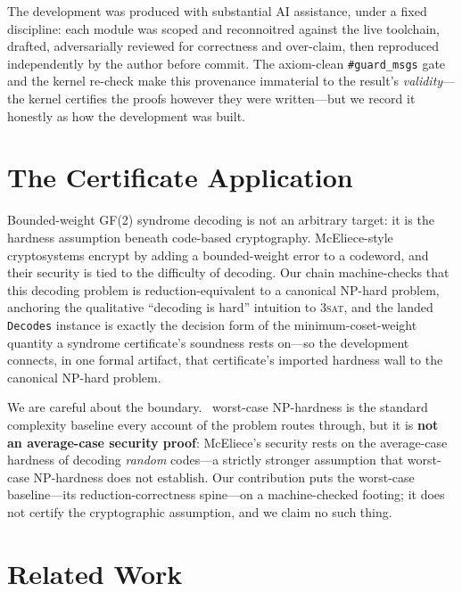 \documentclass[a4paper,UKenglish,cleveref,autoref]{lipics-v2021}
\begin{document}
The development was produced with substantial AI assistance, under a fixed discipline: each module was scoped
and reconnoitred against the live toolchain, drafted, adversarially reviewed for correctness and over-claim,
then reproduced independently by the author before commit. The axiom-clean \lstinline{#guard_msgs} gate and the
kernel re-check make this provenance immaterial to the result's \emph{validity}---the kernel certifies the
proofs however they were written---but we record it honestly as how the development was built.

\section{The Certificate Application}\label{sec:app}

Bounded-weight GF(2) syndrome decoding is not an arbitrary target: it is the hardness assumption beneath
code-based cryptography. McEliece-style cryptosystems encrypt by adding a bounded-weight error to a codeword,
and their security is tied to the difficulty of decoding. Our chain machine-checks that this decoding problem is
reduction-equivalent to a canonical NP-hard problem, anchoring the qualitative ``decoding is hard'' intuition to
\textsc{3sat}, and the landed \lstinline{Decodes} instance is exactly the decision form of the
minimum-coset-weight quantity a syndrome certificate's soundness rests on---so the development connects, in one
formal artifact, that certificate's imported hardness wall to the canonical NP-hard problem.

We are careful about the boundary.~\cite{BMvT78} worst-case NP-hardness is the standard complexity baseline
every account of the problem routes through, but it is \textbf{not an average-case security proof}: McEliece's
security rests on the average-case hardness of decoding \emph{random} codes---a strictly stronger assumption
that worst-case NP-hardness does not establish. Our contribution puts the worst-case baseline---its
reduction-correctness spine---on a machine-checked footing; it does not certify the cryptographic assumption,
and we claim no such thing.

\section{Related Work}\label{sec:related}
\end{document}
